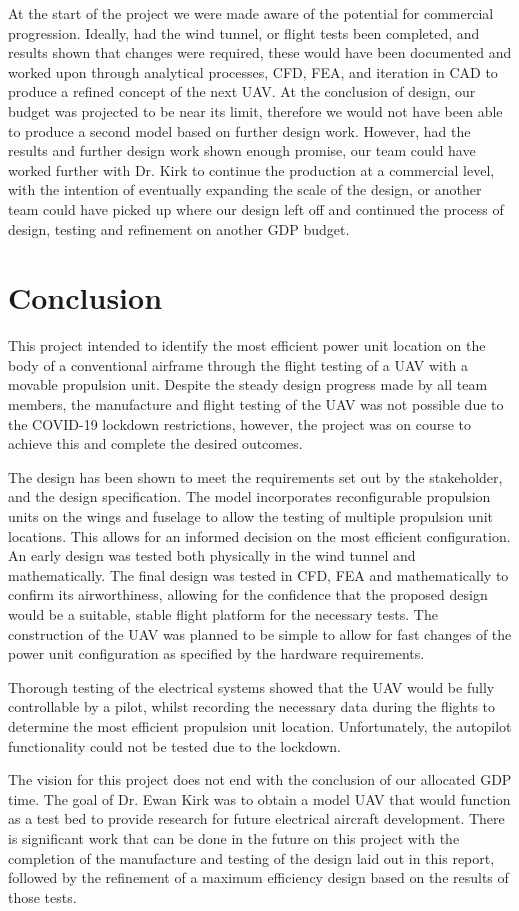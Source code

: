 \documentclass[../../main.tex]{subfiles}
\begin{document}
At the start of the project we were made aware of the potential for commercial progression.
Ideally, had the wind tunnel, or flight tests been completed, and results shown that changes were required, these would have been documented and worked upon through analytical processes, CFD, FEA, and iteration in CAD to produce a refined concept of the next UAV.
At the conclusion of design, our budget was projected to be near its limit, therefore we would not have been able to produce a second model based on further design work.
However, had the results and further design work shown enough promise, our team could have worked further with Dr. Kirk to continue the production at a commercial level, with the intention of eventually expanding the scale of the design, or another team could have picked up where our design left off and continued the process of design, testing and refinement on another GDP budget. 

\section{Conclusion} \label{sec:project-review:conclusion}

This project intended to identify the most efficient power unit location on the body of a conventional airframe through the flight testing of a UAV with a movable propulsion unit.
Despite the steady design progress made by all team members, the manufacture and flight testing of the UAV was not possible due to the COVID-19 lockdown restrictions, however, the project was on course to achieve this and complete the desired outcomes.  

The design has been shown to meet the requirements set out by the stakeholder, and the design specification.
The model incorporates reconfigurable propulsion units on the wings and fuselage to allow the testing of multiple propulsion unit locations.
This allows for an informed decision on the most efficient configuration.
An early design was tested both physically in the wind tunnel and mathematically.
The final design was tested in CFD, FEA and mathematically to confirm its airworthiness, allowing for the confidence that the proposed design would be a suitable, stable flight platform for the necessary tests.
The construction of the UAV was planned to be simple to allow for fast changes of the power unit configuration as specified by the hardware requirements. 

Thorough testing of the electrical systems showed that the UAV would be fully controllable by a pilot, whilst recording the necessary data during the flights to determine the most efficient propulsion unit location.
Unfortunately, the autopilot functionality could not be tested due to the lockdown.  

The vision for this project does not end with the conclusion of our allocated GDP time.
The goal of Dr. Ewan Kirk was to obtain a model UAV that would function as a test bed to provide research for future electrical aircraft development.
There is significant work that can be done in the future on this project with the completion of the manufacture and testing of the design laid out in this report, followed by the refinement of a maximum efficiency design based on the results of those tests. 
\end{document}
